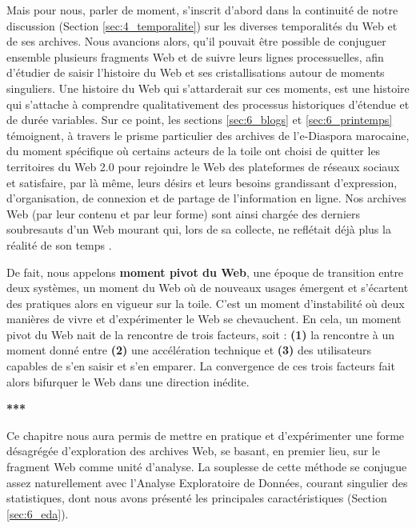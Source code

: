 \documentclass[symmetric,justified,marginals=raggedouter]{tufte-book}
\begin{document}
Mais pour nous, parler de moment, s'inscrit d'abord dans la continuité de notre discussion (Section \ref{sec:4_temporalite}) sur les diverses temporalités du Web et de ses archives. Nous avancions alors, qu'il pouvait être possible de conjuguer ensemble plusieurs fragments Web et de suivre leurs lignes processuelles, afin d'étudier de saisir l'histoire du Web et ses cristallisations autour de moments singuliers. Une histoire du Web qui s'attarderait sur ces moments, est une histoire qui s'attache à comprendre qualitativement des processus historiques d'étendue et de durée variables. Sur ce point, les sections \ref{sec:6_blogs} et \ref{sec:6_printemps} témoignent, à travers le prisme particulier des archives de l'e-Diaspora marocaine, du moment spécifique où certains acteurs de la toile ont choisi de quitter les territoires du Web 2.0 pour rejoindre le Web des plateformes de réseaux sociaux et satisfaire, par là même, leurs désirs et leurs besoins grandissant d'expression, d'organisation, de connexion et de partage de l'information en ligne. Nos archives Web (par leur contenu et par leur forme) sont ainsi chargée des derniers soubresauts d'un Web mourant \citep{stevenson_hypertext_2018} qui, lors de sa collecte, ne reflétait déjà plus la réalité de son temps \citep{helmond_platformization_2015}.

De fait, nous appelons \textbf{moment pivot du Web}, une époque de transition entre deux systèmes, un moment du Web où de nouveaux usages émergent et s'écartent des pratiques alors en vigueur sur la toile. C'est un moment d'instabilité où deux manières de vivre et d'expérimenter le Web se chevauchent. En cela, un moment pivot du Web nait de la rencontre de trois facteurs, soit : \textbf{(1)} la rencontre à un moment donné entre \textbf{(2)} une accélération technique et \textbf{(3)} des utilisateurs capables de s'en saisir et s'en emparer. La convergence de ces trois facteurs fait alors bifurquer le Web dans une direction inédite.

\begin{center}
	\textbf{***}
\end{center}

\noindent Ce chapitre nous aura permis de mettre en pratique et d'expérimenter une forme désagrégée d'exploration des archives Web, se basant, en premier lieu, sur le fragment Web comme unité d'analyse. La souplesse de cette méthode se conjugue assez naturellement avec l'Analyse Exploratoire de Données, courant singulier des statistiques, dont nous avons présenté les principales caractéristiques (Section \ref{sec:6_eda}).
\end{document}
